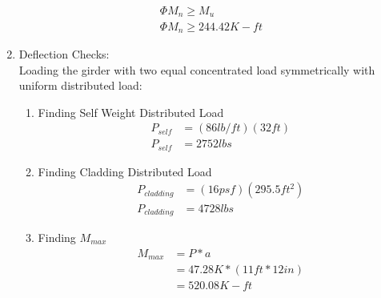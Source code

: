 \documentclass{report} %
\begin{document}
\begin{enumerate}
\begin{equation*}
\begin{aligned}
                    \Phi M_n \geq M_u \\
                    \Phi M_n \geq 244.42 K-ft
                \end{aligned}
            \end{equation*}
            \begin{center}
            \end{center}
    \item Deflection Checks: \\
        Loading the girder with two equal concentrated load symmetrically with uniform distributed load:
        \begin{enumerate}
            \item Finding Self Weight Distributed Load
                \begin{equation*}
                    \begin{aligned}
                        P_{self} &= (86lb/ft)(32ft) \\ %
                        P_{self} &= 2752lbs
                    \end{aligned}
                \end{equation*}
            \item Finding Cladding Distributed Load
                \begin{equation*}
                    \begin{aligned}
                        P_{cladding} &= (16psf)(295.5ft^2) \\ %
                        P_{cladding} &= 4728lbs 
                    \end{aligned}
                \end{equation*}
            \item Finding $M_{max}$ 
                \begin{equation*}
                    \begin{aligned}
                        M_{max} &= P * a \\
                                &= 47.28K * (11ft * 12in) \\  %
                                &= 520.08 K-ft
                    \end{aligned}
                \end{equation*} 

\end{enumerate}
\end{enumerate}
\end{document}
